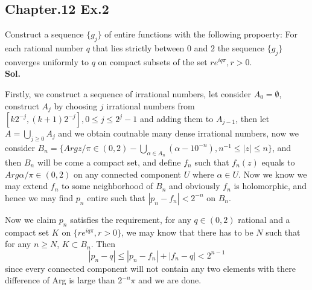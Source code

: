 \documentclass[lang=en,11pt,a4paper,citestyle =authoryear]{elegantpaper}
\begin{document}
\subsection*{Chapter.12 Ex.2} 
Construct a sequence $\{g_j\}$ of entire functions with the following propoerty: For each rational number $q$ that lies strictly between $0$ and $2$ the sequence $\{g_j\}$ converges uniformly to $q$ on compact subsets of the set $re^{iq\pi},r>0$.
\vspace{0.5em}\\
\textbf{Sol.} \par
Firstly, we construct a sequence of irrational numbers, let consider $A_0 = \emptyset$, construct $A_j$ by choosing $j$ irrational numbers from $[k2^{-j},(k+1)2^{-j}], 0\leq j \leq 2^j - 1$ and adding them to $A_{j-1}$, then let $A = \bigcup_{j\geq 0}A_j$ and we obtain coutnable many dense irrational numbers, now we consider $B_n = \{Argz/\pi \in (0,2) - \bigcup_{\alpha \in A_n} (\alpha - 10^{-n}), n^{-1} \leq |z| \leq n\}$, and then $B_n$ will be come a compact set, and define $f_n$ such that $f_n(z)$ equals to $Arg \alpha/\pi \in (0,2)$ on any connected component $U$ where $\alpha \in U$. Now we know we may extend $f_n$ to some neighborhood of $B_n$ and obviously $f_n$ is holomorphic, and hence we may find $p_n$ entire such that $|p_n - f_n| < 2^{-n}$ on $B_n$.\par
Now we claim $p_n$ satisfies the requirement, for any $q\in(0,2)$ rational and a compact set $K$ on $\{re^{iq\pi}, r>0\}$, we may know that there has to be $N$ such that for any $n\geq N$, $K \subset B_n$. Then
\[
|p_n - q| \leq |p_n - f_n| + |f_n-q| <2^{n-1}
\]
since every connected component will not contain any two elements with there difference of Arg is large than $2^{-n}\pi$ and we are done.
\vspace{0.5em}

\addappheadtotoc
\end{document}

